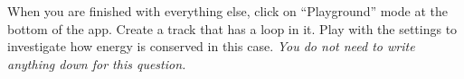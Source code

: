 \documentclass[10pt]{exam}
\begin{document}
\begin{questions}


\question
	When you are finished with everything else, click on ``Playground'' mode at the bottom of the app.  Create a track that has a loop in it.  Play with the settings to investigate how energy is conserved in this case.  \emph{You do not need to write anything down for this question.}


\end{questions}
\end{document}
